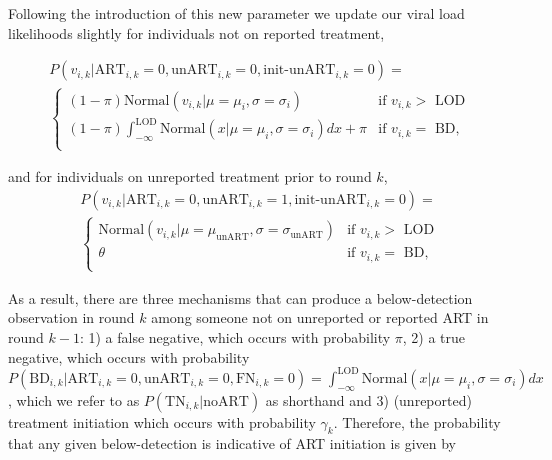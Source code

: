 \documentclass{article}[11pt]
\begin{document}
Following the introduction of this new parameter we update our viral load likelihoods slightly for individuals not on reported treatment, 

\begin{equation}
\begin{split}
P(v_{i,k} | \text{ART}_{i,k}=0, \text{unART}_{i,k}=0, \text{init-unART}_{i,k}=0) = \\
\begin{cases}
        (1-\pi) \text{Normal}(v_{i,k} | \mu=\mu_i, \sigma=\sigma_i)  & \text{if } v_{i,k} >\text{ LOD} \\
        (1-\pi) \int_{-\infty}^\text{LOD}\text{Normal}(x | \mu=\mu_i, \sigma=\sigma_i)dx + \pi  & \text{if } v_{i,k} =\text{ BD}, \\
    \end{cases}
\end{split}
\end{equation}

and for individuals on unreported treatment prior to round $k$,
\begin{equation}\begin{split}
P(v_{i,k} | \text{ART}_{i,k}=0, \text{unART}_{i,k}=1, \text{init-unART}_{i,k}=0) = \\
\begin{cases}
        \text{Normal}(v_{i,k} | \mu=\mu_\text{unART}, \sigma=\sigma_\text{unART})  & \text{if } v_{i,k} >\text{ LOD} \\
        \theta  & \text{if } v_{i,k} =\text{ BD}, \\
    \end{cases}
\end{split}
\end{equation}

As a result, there are three mechanisms that can produce a below-detection observation in round $k$ among someone not on unreported or reported ART in round $k-1$: 1) a false negative, which occurs with probability $\pi$, 2) a true negative, which occurs with probability $P(\text{BD}_{i,k} | \text{ART}_{i,k} = 0, \text{unART}_{i,k} = 0, \text{FN}_{i,k}=0) = \int_{-\infty}^\text{LOD}\text{Normal}(x | \mu=\mu_i, \sigma=\sigma_i)dx$, which we refer to as $P(\text{TN}_{i,k}|\text{noART})$ as shorthand and 3) (unreported) treatment initiation which occurs with probability $\gamma_k$. Therefore, the probability that any given below-detection is indicative of ART initiation is given by
\end{document}
